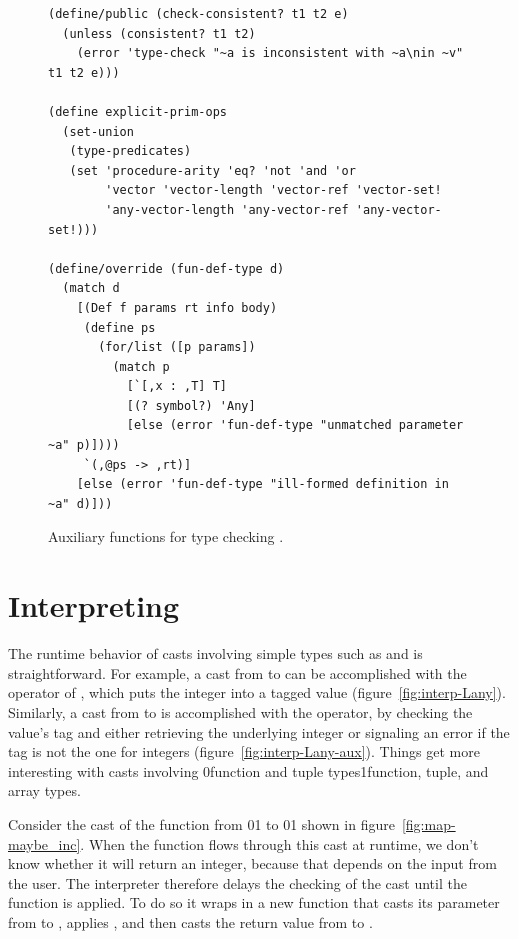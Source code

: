 \documentclass[7x10]{TimesAPriori_MIT}%
\def\racketEd{0}
\def\pythonEd{1}
\def\edition{1}
\newcommand{\racket}[1]{{\if\edition\racketEd{#1}\fi}}
\newcommand{\pythonColor}[0]{}
\newcommand{\python}[1]{{\if\edition\pythonEd\pythonColor #1\fi}}
\numberwithin{theorem}{chapter}
\numberwithin{definition}{chapter}
\numberwithin{equation}{chapter}
\begin{document}
{\begin{figure}[tbp]
\begin{tcolorbox}[colback=white]
\begin{lstlisting}
(define/public (check-consistent? t1 t2 e)
  (unless (consistent? t1 t2)
    (error 'type-check "~a is inconsistent with ~a\nin ~v" t1 t2 e)))

(define explicit-prim-ops
  (set-union
   (type-predicates)
   (set 'procedure-arity 'eq? 'not 'and 'or
        'vector 'vector-length 'vector-ref 'vector-set!
        'any-vector-length 'any-vector-ref 'any-vector-set!)))

(define/override (fun-def-type d)
  (match d
    [(Def f params rt info body)
     (define ps
       (for/list ([p params])
         (match p
           [`[,x : ,T] T]
           [(? symbol?) 'Any]
           [else (error 'fun-def-type "unmatched parameter ~a" p)])))
     `(,@ps -> ,rt)]
    [else (error 'fun-def-type "ill-formed definition in ~a" d)]))
\end{lstlisting}
\end{tcolorbox}

\caption{Auxiliary functions for type checking \LangGrad{}.}
\label{fig:type-check-Lgradual-aux}
\end{figure}

\fi}


\clearpage

\section{Interpreting \LangCast{}}
\label{sec:interp-casts}

The runtime behavior of casts involving simple types such as
\INTTY{} and \BOOLTY{} is straightforward.  For example, a
cast from \INTTY{} to \CANYTY{} can be accomplished with the
 operator of \LangAny{}, which puts the integer into a
tagged value (figure~\ref{fig:interp-Lany}). Similarly, a cast from
\CANYTY{} to \INTTY{} is accomplished with the 
operator, by checking the value's tag and either retrieving
the underlying integer or signaling an error if the tag is not the
one for integers (figure~\ref{fig:interp-Lany-aux}).
%
Things get more interesting with casts involving
\racket{function and tuple types}\python{function, tuple, and array types}.

Consider the cast of the function  from
\racket{}\python{}
to
\racket{}\python{}
shown in figure~\ref{fig:map-maybe_inc}.
When the  function flows through
this cast at runtime, we don't know whether it will return
an integer, because that depends on the input from the user.
The \LangCast{} interpreter therefore delays the checking
of the cast until the function is applied. To do so it
wraps  in a new function that casts its parameter
from \INTTY{} to \CANYTY{}, applies , and then
casts the return value from \CANYTY{} to \INTTY{}.
\end{document}

